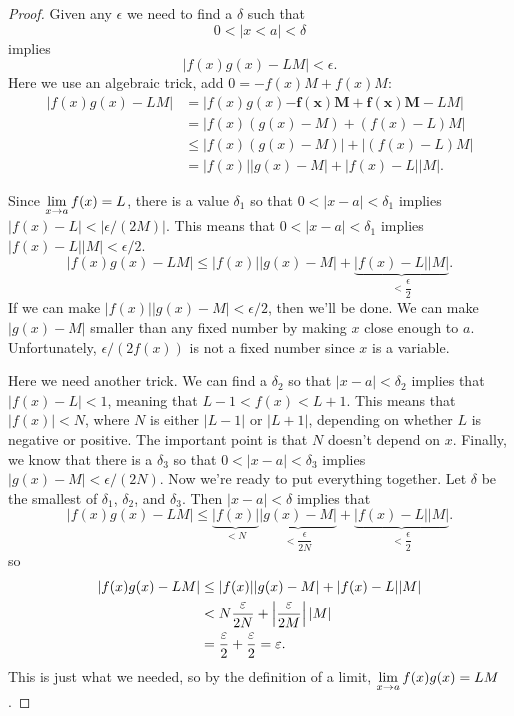 \begin{proof} 
Given any $\epsilon$ we need to find a $\delta$ such that
\[
0<|x< a|< \delta
\]
implies 
\[
|f(x)g(x)-LM|< \epsilon.  
\]
Here we use an algebraic trick, add $0 = -f(x)M+f(x)M$:
\begin{align*}
|f(x)g(x)-LM| &= |f(x)g(x)\boldsymbol{-f(x)M+f(x)M}-LM| \\
&=|f(x)(g(x)-M)+(f(x)-L)M| \\
&\le |f(x)(g(x)-M)|+|(f(x)-L)M| \\
&=|f(x)||g(x)-M|+|f(x)-L||M|.
\end{align*}


Since $\ds \lim_{x\to a}f(x) =L$, there is a value $\delta_1$ so that
$0<|x-a|<\delta_1$ implies $|f(x)-L|<|\epsilon/(2M)|$. This means that
$0<|x-a|<\delta_1$ implies $|f(x)-L||M|< \epsilon/2$. 
\[
|f(x)g(x)-LM|\le|f(x)||g(x)-M|+\underbrace{|f(x)-L||M|}_{<\dfrac{\epsilon}{2}}.
\]
If we can make $|f(x)||g(x)-M|<\epsilon/2$, then we'll be done. We can
make $|g(x)-M|$ smaller than any fixed number by making $x$ close
enough to $a$. Unfortunately, $\epsilon/(2f(x))$ is not a fixed number
since $x$ is a variable.

Here we need another trick. We can find a $\delta_2$ so that
$|x-a|<\delta_2$ implies that $|f(x)-L|<1$, meaning that $L-1 < f(x) <
L+1$. This means that $|f(x)|<N$, where $N$ is either $|L-1|$ or
$|L+1|$, depending on whether $L$ is negative or positive. The
important point is that $N$ doesn't depend on $x$. Finally, we know
that there is a $\delta_3$ so that $0<|x-a|<\delta_3$ implies
$|g(x)-M|<\epsilon/(2N)$. Now we're ready to put everything
together. Let $\delta$ be the smallest of $\delta_1$, $\delta_2$, and
$\delta_3$. Then $|x-a|<\delta$ implies that
\[
|f(x)g(x)-LM|\le\underbrace{|f(x)|}_{<N}\underbrace{|g(x)-M|}_{<\dfrac{\epsilon}{2N}}+\underbrace{|f(x)-L||M|}_{<\dfrac{\epsilon}{2}}.
\]
so
\begin{align*}
|f(x)g(x)-LM|&\le|f(x)||g(x)-M|+|f(x)-L||M| \\
&<N{\epsilon\over 2N}+\left|{\epsilon\over 2M}\right||M| \\
&={\epsilon\over 2}+{\epsilon\over 2}=\epsilon.
\end{align*}
This is just what we needed, so by the definition of a limit,
$\ds \lim_{x\to a}f(x)g(x)=LM$.
\end{proof}



